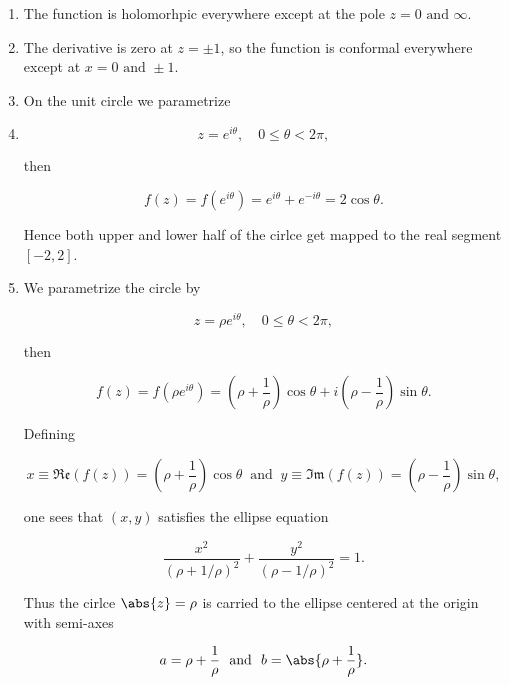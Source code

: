 \documentclass[english,a4paper,12pt]{report}
\begin{document}
{\begin{enumerate}
    \item The function is holomorhpic everywhere except at the pole \(z = 0 \text { and } \infty\).
    \item  The derivative is zero at \(z = \pm 1\), so the function is conformal everywhere except at \(x = 0 \text { and } \pm 1\).
    \item On the unit circle we parametrize 
    \item 
    \begin{equation}
        z = e^{i \theta }, \quad 0 \le \theta <2\pi ,
    \end{equation}

    then

    \begin{equation}
        f(z) = f(e^{i \theta } ) = e^{i \theta } + e^{-i \theta } = 2 \cos \theta.
    \end{equation}
    
    Hence both upper and lower half of the cirlce get mapped to the real segment \([-2,2]\). 

    \item We parametrize the circle by 
    
    \begin{equation}
        z=\rho e^{i \theta }, \quad 0 \le \theta < 2\pi ,
    \end{equation}
    
    then 

    \begin{equation}
        f(z) = f(\rho e^{i \theta } )= \left( \rho +\frac{1}{\rho }  \right)\cos \theta + i \left( \rho - \frac{1}{\rho }  \right) \sin \theta .
    \end{equation}
    
    Defining 

    \begin{equation}
        x \equiv \mathfrak{Re} (f(z)) = \left( \rho +\frac{1}{\rho }  \right) \cos \theta ~\text { and }~ y \equiv \mathfrak{Im} (f(z)) = \left( \rho -\frac{1}{\rho }  \right) \sin \theta ,
    \end{equation}
    
    one sees that \((x,y)\) satisfies the ellipse equation 

    \begin{equation}
        \frac{x^2}{(\rho +1 /\rho )^2} + \frac{y^2}{(\rho -1 /\rho )^2} = 1.  
    \end{equation}
    
    Thus the cirlce \(\abs{z} = \rho  \) is carried to the ellipse centered at the origin with semi-axes
    
    \begin{equation}
        a = \rho + \frac{1}{\rho } ~\text { and }~ b = \abs{\rho +\frac{1}{\rho } }.
    \end{equation}
\end{enumerate}
~
} 
\end{document}
